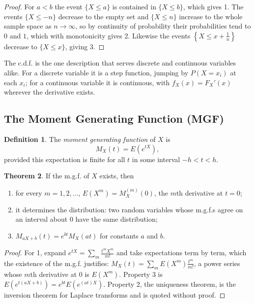 \documentclass[12pt,a4paper]{report}
\theoremstyle{definition}
\newtheorem{thm}{Theorem}[section]
\newtheorem{definition}[thm]{Definition}
\theoremstyle{plain}
\begin{document}
\begin{proof}
For $a<b$ the event $\{X\leq a\}$ is contained in $\{X\leq b\}$, which gives 1.
The events $\{X\leq -n\}$ decrease to the empty set and $\{X\leq n\}$ increase to
the whole sample space as $n\to\infty$, so by continuity of probability their
probabilities tend to $0$ and $1$, which with monotonicity gives 2. Likewise the
events $\left\{X\leq x + \frac1n\right\}$ decrease to $\{X\leq x\}$, giving 3.
\end{proof}

The c.d.f. is the one description that serves discrete and continuous variables
alike. For a discrete variable it is a step function, jumping by $P(X = x_i)$ at
each $x_i$; for a continuous variable it is continuous, with
$f_X(x) = F_X'(x)$ wherever the derivative exists.

\subsection{The Moment Generating Function (MGF)}

\begin{definition}
\label{def:mgf}
The \emph{moment generating function} of $X$ is
\[M_X(t) = E\left(e^{tX}\right),\]
provided this expectation is finite for all $t$ in some interval $-h<t<h$.
\end{definition}

\begin{thm}
\label{thm:mgfprops}
If the m.g.f. of $X$ exists, then
\begin{enumerate}
\item for every $m = 1,2,\dots$, $E(X^m) = M_X^{(m)}(0)$, the $m$th
derivative at $t = 0$;
\item it determines the distribution: two random variables whose m.g.f.s agree
on an interval about $0$ have the same distribution;
\item $M_{aX + b}(t) = e^{bt}M_X(at)$ for constants $a$ and $b$.
\end{enumerate}
\end{thm}

\begin{proof}
For 1, expand $e^{tX} = \sum_m \frac{t^mX^m}{m!}$ and take expectations term by
term, which the existence of the m.g.f. justifies: $M_X(t) = \sum_m
E(X^m)\frac{t^m}{m!}$, a power series whose $m$th derivative at $0$ is $E(X^m)$.
Property 3 is $E\left(e^{t(aX + b)}\right) = e^{bt}E\left(e^{(at)X}\right)$.
Property 2, the uniqueness theorem, is the inversion theorem for Laplace
transforms and is quoted without proof.
\end{proof}
\end{document}
